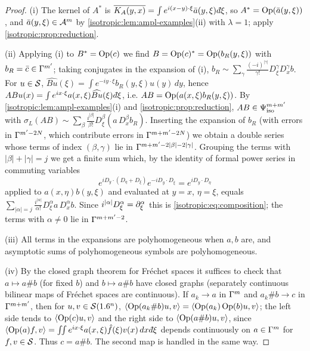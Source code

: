 \begin{proof}
(i) The kernel of $A^*$ is $\overline{K_A(y,x)}=\int e^{i(x-y)\cdot\xi}\bar a(y,\xi)\,\dbar\xi$,
so $A^*=\operatorname{Op}(\bar a(y,\xi))$, and $\bar a(y,\xi)\in\mathcal{A}^{m}$ by
\cref{isotropic:lem:ampl-examples}(ii) with $\lambda=1$; apply
\cref{isotropic:prop:reduction}.

(ii) Applying (i) to $B^*=\operatorname{Op}(c)$ we find $B=\operatorname{Op}(c)^*=\operatorname{Op}(b_R(y,\xi))$ with
$b_R=\bar c\in\Gamma^{m'}$; taking conjugates in the expansion of (i),
$b_R\sim\sum_\gamma\frac{(-i)^{|\gamma|}}{\gamma!}D_\xi^\gamma D_x^\gamma b$. For
$u\in\mathcal{S}$, $\widehat{Bu}(\xi)=\int e^{-iy\cdot\xi}b_R(y,\xi)u(y)\,dy$, hence
$ABu(x)=\int e^{ix\cdot\xi}a(x,\xi)\widehat{Bu}(\xi)\,\dbar\xi$, i.e.
$AB=\operatorname{Op}(a(x,\xi)b_R(y,\xi))$. By \cref{isotropic:lem:ampl-examples}(i) and
\cref{isotropic:prop:reduction}, $AB\in\Psi^{m+m'}_{\mathrm{iso}}$ with
$\sigma_L(AB)\sim\sum_\beta\frac{i^{|\beta|}}{\beta!}D_\xi^\beta(a\,D_x^\beta b_R)$.
Inserting the expansion of $b_R$ (with errors in $\Gamma^{m'-2N}$, which
contribute errors in $\Gamma^{m+m'-2N}$) we obtain a double series whose terms of
index $(\beta,\gamma)$ lie in $\Gamma^{m+m'-2|\beta|-2|\gamma|}$. Grouping the
terms with $|\beta|+|\gamma|=j$ we get a finite sum which, by the identity of
formal power series in commuting variables
\begin{equation*}
  e^{iD_y\cdot(D_\eta+D_\xi)}e^{-iD_y\cdot D_\xi}=e^{iD_y\cdot D_\eta}
\end{equation*}
applied to $a(x,\eta)b(y,\xi)$ and evaluated at $y=x$, $\eta=\xi$, equals
$\sum_{|\alpha|=j}\frac{i^{|\alpha|}}{\alpha!}D_\xi^\alpha a\,D_x^\alpha b$.
Since $i^{|\alpha|}D_\xi^\alpha=\partial_\xi^\alpha$ this is
\eqref{isotropic:eq:composition}; the terms with $\alpha\ne0$ lie in
$\Gamma^{m+m'-2}$.

(iii) All terms in the expansions are polyhomogeneous when $a,b$ are, and
asymptotic sums of polyhomogeneous symbols are polyhomogeneous.

(iv) By the closed graph theorem for Fréchet spaces it suffices to check that
$a\mapsto a\#b$ (for fixed $b$) and $b\mapsto a\#b$ have closed graphs
(separately continuous bilinear maps of Fréchet spaces are continuous). If
$a_k\to a$ in $\Gamma^{m}$ and $a_k\#b\to c$ in $\Gamma^{m+m'}$, then for
$u,v\in\mathcal{S}(1.6^n)$, $\langle \operatorname{Op}(a_k\#b)u, v\rangle=\langle \operatorname{Op}(a_k)\operatorname{Op}(b)u, v\rangle$; the
left side tends to $\langle \operatorname{Op}(c)u, v\rangle$ and the right side to
$\langle \operatorname{Op}(a\#b)u, v\rangle$, since $\pair{\Op(a)f}{v}=\int\!\!\int e^{ix\cdot\xi}a(x,\xi)\hat f(\xi)v(x)\,dx\,\dbar\xi$
depends continuously on $a\in\Gamma^{m}$ for $f,v\in\mathcal{S}$. Thus $c=a\#b$. The second
map is handled in the same way.
\end{proof}

